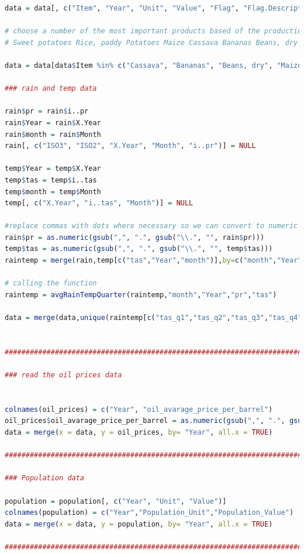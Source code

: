 \documentclass[11pt]{article}
\begin{document}
\begin{lstlisting}[language= R]
data = data[, c("Item", "Year", "Unit", "Value", "Flag", "Flag.Description")] 

# choose a number of the most important products based of the production quantity 
# Sweet potatoes Rice, paddy Potatoes Maize Cassava Bananas Beans, dry

data = data[data$Item %in% c("Cassava", "Bananas", "Beans, dry", "Maize", "Sweet potatoes", "Potatoes", "Rice, paddy"),]

### rain and temp data 

rain$pr = rain$i..pr
rain$Year = rain$X.Year
rain$month = rain$Month
rain[, c("ISO3", "ISO2", "X.Year", "Month", "i..pr")] = NULL

temp$Year = temp$X.Year
temp$tas = temp$i..tas
temp$month = temp$Month
temp[, c("X.Year", "i..tas", "Month")] = NULL

#replace commas with dots where necessary so we can convert to numeric
rain$pr = as.numeric(gsub(",", ".", gsub("\\.", "", rain$pr)))
temp$tas = as.numeric(gsub(",", ".", gsub("\\.", "", temp$tas)))
raintemp = merge(rain,temp[c("tas","Year","month")],by=c("month","Year"))

# calling the function 
raintemp = avgRainTempQuarter(raintemp,"month","Year","pr","tas")

data = merge(data,unique(raintemp[c("tas_q1","tas_q2","tas_q3","tas_q4","pr_q1","pr_q2","pr_q3","pr_q4","Year")]),by=c("Year"))


##################################################################################################

### read the oil prices data


colnames(oil_prices) = c("Year", "oil_avarage_price_per_barrel")
oil_prices$oil_avarage_price_per_barrel = as.numeric(gsub(",", ".", gsub("\\.", "", oil_prices$oil_avarage_price_per_barrel)))
data = merge(x = data, y = oil_prices, by= "Year", all.x = TRUE)

###################################################################################################

### Population data 

population = population[, c("Year", "Unit", "Value")]
colnames(population) = c("Year","Population_Unit","Population_Value")
data = merge(x = data, y = population, by= "Year", all.x = TRUE)

##################################################################################################


\end{lstlisting}
\end{document}
